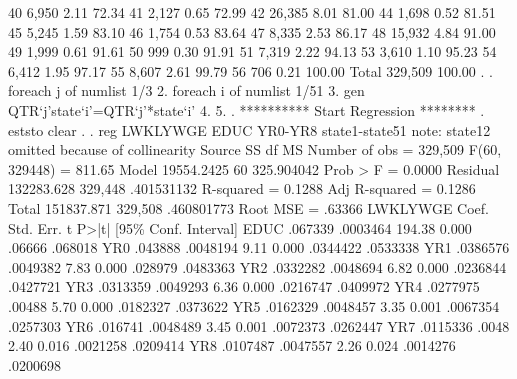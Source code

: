          40 {\VBAR}      6,950        2.11       72.34
         41 {\VBAR}      2,127        0.65       72.99
         42 {\VBAR}     26,385        8.01       81.00
         44 {\VBAR}      1,698        0.52       81.51
         45 {\VBAR}      5,245        1.59       83.10
         46 {\VBAR}      1,754        0.53       83.64
         47 {\VBAR}      8,335        2.53       86.17
         48 {\VBAR}     15,932        4.84       91.00
         49 {\VBAR}      1,999        0.61       91.61
         50 {\VBAR}        999        0.30       91.91
         51 {\VBAR}      7,319        2.22       94.13
         53 {\VBAR}      3,610        1.10       95.23
         54 {\VBAR}      6,412        1.95       97.17
         55 {\VBAR}      8,607        2.61       99.79
         56 {\VBAR}        706        0.21      100.00
      Total {\VBAR}    329,509      100.00
{\smallskip}
. 
. foreach j of numlist 1/3 {\lbr}
  2. foreach i of numlist 1/51 {\lbr}
  3. gen QTR`j'state`i'=QTR`j'*state`i'
  4. {\rbr}
  5. {\rbr}
{\smallskip}
. **********  Start Regression ********
. eststo clear
{\smallskip}
. 
. reg  LWKLYWGE EDUC  YR0-YR8 state1-state51
note: state12 omitted because of collinearity
{\smallskip}
      Source {\VBAR}       SS           df       MS      Number of obs   =   329,509
   F(60, 329448)   =    811.65
       Model {\VBAR}  19554.2425        60  325.904042   Prob > F        =    0.0000
    Residual {\VBAR}  132283.628   329,448  .401531132   R-squared       =    0.1288
   Adj R-squared   =    0.1286
       Total {\VBAR}  151837.871   329,508  .460801773   Root MSE        =    .63366
{\smallskip}
    LWKLYWGE {\VBAR}      Coef.   Std. Err.      t    P>|t|     [95\% Conf. Interval]
        EDUC {\VBAR}    .067339   .0003464   194.38   0.000       .06666     .068018
         YR0 {\VBAR}    .043888   .0048194     9.11   0.000     .0344422    .0533338
         YR1 {\VBAR}   .0386576   .0049382     7.83   0.000      .028979    .0483363
         YR2 {\VBAR}   .0332282   .0048694     6.82   0.000     .0236844    .0427721
         YR3 {\VBAR}   .0313359   .0049293     6.36   0.000     .0216747    .0409972
         YR4 {\VBAR}   .0277975     .00488     5.70   0.000     .0182327    .0373622
         YR5 {\VBAR}   .0162329   .0048457     3.35   0.001     .0067354    .0257303
         YR6 {\VBAR}    .016741   .0048489     3.45   0.001     .0072373    .0262447
         YR7 {\VBAR}   .0115336      .0048     2.40   0.016     .0021258    .0209414
         YR8 {\VBAR}   .0107487   .0047557     2.26   0.024     .0014276    .0200698
